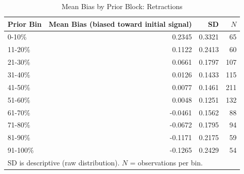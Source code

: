 \begin{table}[htbp]
\centering
\caption{Mean Bias by Prior Block: Retractions}
\label{tab:ret_bias_prior}
\begin{tabular}{lrrr}
\hline
Prior Bin & Mean Bias (biased toward initial signal) & SD & $N$ \\
\hline
0-10\% & 0.2345 & 0.3321 & 65 \\
11-20\% & 0.1122 & 0.2413 & 60 \\
21-30\% & 0.0661 & 0.1797 & 107 \\
31-40\% & 0.0126 & 0.1433 & 115 \\
41-50\% & 0.0077 & 0.1461 & 211 \\
51-60\% & 0.0048 & 0.1251 & 132 \\
61-70\% & -0.0461 & 0.1562 & 88 \\
71-80\% & -0.0672 & 0.1795 & 94 \\
81-90\% & -0.1171 & 0.2175 & 59 \\
91-100\% & -0.1265 & 0.2429 & 54 \\
\hline
\multicolumn{4}{l}{\small SD is descriptive (raw distribution). $N$ = observations per bin.} \\
\end{tabular}
\end{table}
